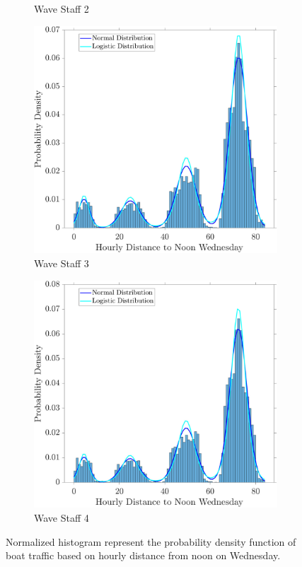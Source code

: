 \documentclass[
10pt, %
letterpaper, %
twoside, %
headinclude,footinclude, %
BCOR5mm, %
]{scrartcl}
\begin{document}
\begin{figure}[h!]
\begin{subfigure}[t]{0.49\linewidth}
		\caption{Wave Staff 2} 
		\label{fig:HourL2}
	\end{subfigure}
	\begin{subfigure}[t]{0.49\linewidth}
		\centering
		\includegraphics[width=\linewidth]{figures/HourPDF_LOG3.pdf}
		\caption{Wave Staff 3} 
		\label{fig:HourL3}
	\end{subfigure}
	\begin{subfigure}[t]{0.49\linewidth}
		\centering
		\includegraphics[width=\linewidth]{figures/HourPDF_LOG4.pdf}
		\caption{Wave Staff 4} 
		\label{fig:HourL4}
	\end{subfigure}
	\caption{Normalized histogram represent the probability density function of boat traffic based on hourly distance from noon on Wednesday.}
	\label{fig:Hourly}
\end{figure}
\end{document}
